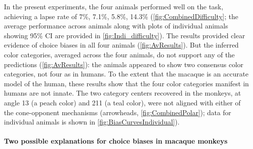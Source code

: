 In the present experiments, the four animals performed well on the task, achieving a lapse rate of 7\%, 7.1\%, 5.8\%, 14.3\% (\autoref{fig:CombinedDifficulty}; the average performance across animals along with plots of individual animals showing 95\% CI are provided in \autoref{fig:Indi_difficulty}). %
The results provided clear evidence of choice biases in all four animals (\autoref{fig:AvResults}).
But the inferred color categories, averaged across the four animals, do not support any of the predictions (\autoref{fig:AvResults}): the animals appeared to show two consensus color categories, not four as in humans. 
To the extent that the macaque is an accurate model of the human, these results show that the four color categories manifest in humans are not innate. 
The two category centers recovered in the monkeys, at angle 13 (a peach color) and 211 (a teal color), were not aligned with either of the cone-opponent mechanisms (arrowheads, \autoref{fig:CombinedPolar}); data for individual animals is shown in \autoref{fig:BiasCurvesIndividual}).

\paragraph{Two possible explanations for choice biases in macaque monkeys}

